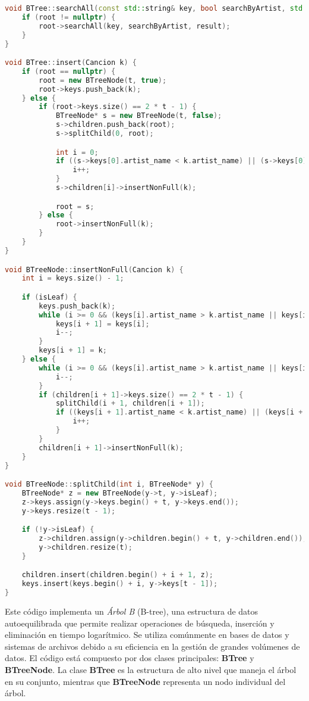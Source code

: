 \documentclass[corference]{IEEEtran}
\begin{document}
\begin{flushleft}
\begin{lstlisting}[language=C++, style=mystyle, caption={Código de un Árbol B}]
void BTree::searchAll(const std::string& key, bool searchByArtist, std::vector<Cancion>& result) {
    if (root != nullptr) {
        root->searchAll(key, searchByArtist, result);
    }
}

void BTree::insert(Cancion k) {
    if (root == nullptr) {
        root = new BTreeNode(t, true);
        root->keys.push_back(k);
    } else {
        if (root->keys.size() == 2 * t - 1) {
            BTreeNode* s = new BTreeNode(t, false);
            s->children.push_back(root);
            s->splitChild(0, root);

            int i = 0;
            if ((s->keys[0].artist_name < k.artist_name) || (s->keys[0].track_name < k.track_name)) {
                i++;
            }
            s->children[i]->insertNonFull(k);

            root = s;
        } else {
            root->insertNonFull(k);
        }
    }
}

void BTreeNode::insertNonFull(Cancion k) {
    int i = keys.size() - 1;

    if (isLeaf) {
        keys.push_back(k);
        while (i >= 0 && (keys[i].artist_name > k.artist_name || keys[i].track_name > k.track_name)) {
            keys[i + 1] = keys[i];
            i--;
        }
        keys[i + 1] = k;
    } else {
        while (i >= 0 && (keys[i].artist_name > k.artist_name || keys[i].track_name > k.track_name)) {
            i--;
        }
        if (children[i + 1]->keys.size() == 2 * t - 1) {
            splitChild(i + 1, children[i + 1]);
            if ((keys[i + 1].artist_name < k.artist_name) || (keys[i + 1].track_name < k.track_name)) {
                i++;
            }
        }
        children[i + 1]->insertNonFull(k);
    }
}

void BTreeNode::splitChild(int i, BTreeNode* y) {
    BTreeNode* z = new BTreeNode(y->t, y->isLeaf);
    z->keys.assign(y->keys.begin() + t, y->keys.end());
    y->keys.resize(t - 1);

    if (!y->isLeaf) {
        z->children.assign(y->children.begin() + t, y->children.end());
        y->children.resize(t);
    }

    children.insert(children.begin() + i + 1, z);
    keys.insert(keys.begin() + i, y->keys[t - 1]);
}
            \end{lstlisting}

            \noindent\hspace{4em}Este código implementa un \textit{Árbol B} (B-tree), una estructura de datos autoequilibrada que permite realizar operaciones de búsqueda, inserción y eliminación en tiempo logarítmico. Se utiliza comúnmente en bases de datos y sistemas de archivos debido a su eficiencia en la gestión de grandes volúmenes de datos. El código está compuesto por dos clases principales: \textbf{BTree} y \textbf{BTreeNode}. La clase \textbf{BTree} es la estructura de alto nivel que maneja el árbol en su conjunto, mientras que \textbf{BTreeNode} representa un nodo individual del árbol.
            

\end{flushleft}
\end{document}

